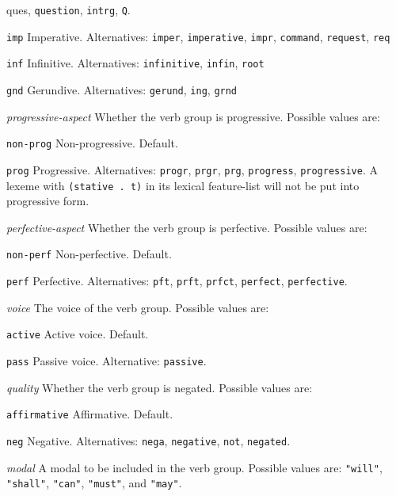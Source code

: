 \documentclass{book}
\begin{document}
\begin{description}
\begin{description}
{ques}, {\tt question}, {\tt intrg}, {\tt Q}.
\item{\tt imp} Imperative.  Alternatives: {\tt imper}, {\tt imperative}, {\tt impr}, {\tt command},
{\tt request}, {\tt req}
\item{\tt inf} Infinitive. Alternatives: {\tt infinitive}, {\tt infin}, {\tt root}
\item{\tt gnd} Gerundive. Alternatives: {\tt gerund}, {\tt ing}, {\tt grnd}
\end{description}
\item{\it progressive-aspect} Whether the verb group is progressive.  Possible values are:
\begin{description}
\item{\tt non-prog} Non-progressive. Default.
\item{\tt prog} Progressive.  Alternatives: {\tt progr}, {\tt prgr}, {\tt prg}, {\tt progress}, {\tt progressive}.
A lexeme with {\tt (stative~.~t)} in its lexical feature-list will not be put into progressive form.
\end{description}
\item{\it perfective-aspect} Whether the verb group is perfective.  Possible values are:
\begin{description}
\item{\tt non-perf} Non-perfective. Default.
\item{\tt perf} Perfective.  Alternatives: {\tt pft}, {\tt prft}, {\tt prfct}, {\tt perfect}, {\tt perfective}.
\end{description}
\pagebreak
\item{\it voice} The voice of the verb group.  Possible values are:
\begin{description}
\item{\tt active} Active voice. Default.
\item{\tt pass} Passive voice.  Alternative: {\tt passive}.
\end{description}
\item{\it quality} Whether the verb group is negated.  Possible values are:
\begin{description}
\item{\tt affirmative} Affirmative. Default.
\item{\tt neg} Negative.  Alternatives: {\tt nega}, {\tt negative}, {\tt not}, {\tt negated}.
\end{description}
\item{\it modal} A modal to be included in the verb group.  Possible values are: {\tt "will"}, {\tt
"shall"}, {\tt "can"}, {\tt "must"}, and {\tt "may"}.
\end{description}
\end{document}
